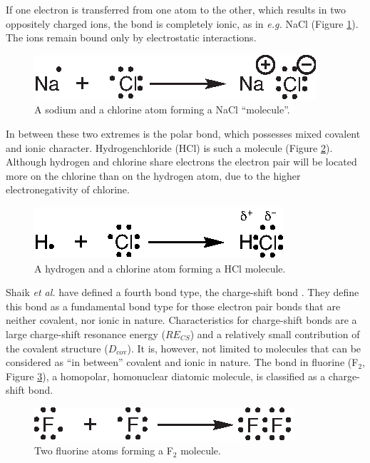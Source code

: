 If one electron is transferred from one atom to the other, which results in two oppositely charged ions, the bond is completely ionic, as in \textit{e.g.} NaCl (Figure \ref{ch3.fig.nacl}). The ions remain bound only by electrostatic interactions. 
\begin{figure}[ht]
\center
\includegraphics{dissociation/figures/nacl.eps}
\caption{A sodium and a chlorine atom forming a NaCl ``molecule''.}
\label{ch3.fig.nacl}
\end{figure}

In between these two extremes is the polar bond, which possesses mixed covalent and ionic character. Hydrogenchloride (HCl) is such a molecule (Figure \ref{ch3.fig.hcl}). Although hydrogen and chlorine share electrons the electron pair will be located more on the chlorine than on the hydrogen atom, due to the higher electronegativity of chlorine.
\begin{figure}[ht]
\center
\includegraphics{dissociation/figures/hcl.eps}
\caption{A hydrogen and a chlorine atom forming a HCl molecule.}
\label{ch3.fig.hcl}
\end{figure}

Shaik \textit{et al.} have defined a fourth bond type, the charge-shift bond \cite{cs1,cs2}. They define this bond as a fundamental bond type for those electron pair bonds that are neither covalent, nor ionic in nature. Characteristics for charge-shift bonds are a large charge-shift resonance energy ($RE_{CS}$) and a relatively small contribution of the covalent structure ($D_\mathrm{cov}$). It is, however, not limited to molecules that can be considered as ``in between'' covalent and ionic in nature. The bond in fluorine (F$_2$, Figure \ref{ch3.fig.f_twee}), a homopolar, homonuclear diatomic molecule, is classified as a charge-shift bond.
\begin{figure}[h]
\center
\includegraphics{dissociation/figures/f_twee.eps}
\caption{Two fluorine atoms forming a F$_2$ molecule.}
\label{ch3.fig.f_twee} 
\end{figure}


